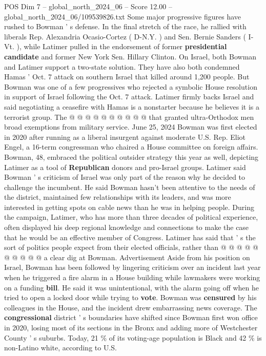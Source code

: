 \begin{textsample}{POS Dim 7 – global\_north\_2024\_06 – Score 12.00 – global\_north\_2024\_06/109539826.txt}
Some major progressive figures have rushed to Bowman ' s defense.
In the final stretch of the race, he rallied with liberals Rep.
Alexandria Ocasio-Cortez ( D-N.Y. ) and Sen.
Bernie Sanders ( I-Vt. ), while Latimer pulled in the endorsement of former \textbf{presidential} \textbf{candidate} and former New York Sen.
Hillary Clinton.
On Israel, both Bowman and Latimer support a two-state solution.
They have also both condemned Hamas ' Oct. 7 attack on southern Israel that killed around 1,200 people.
But Bowman was one of a few progressives who rejected a symbolic House resolution in support of Israel following the Oct. 7 attack.
Latimer firmly backs Israel and said negotiating a ceasefire with Hamas is a nonstarter because he believes it is a terrorist group.
The @ @ @ @ @ @ @ @ @ @ that granted ultra-Orthodox men broad exemptions from military service.
June 25, 2024 Bowman was first elected in 2020 after running as a liberal insurgent against moderate U.S.
Rep.
Eliot Engel, a 16-term congressman who chaired a House committee on foreign affairs.
Bowman, 48, embraced the political outsider strategy this year as well, depicting Latimer as a tool of \textbf{Republican} donors and pro-Israel groups.
Latimer said Bowman ' s criticism of Israel was only part of the reason why he decided to challenge the incumbent.
He said Bowman hasn't been attentive to the needs of the district, maintained few relationships with its leaders, and was more interested in getting spots on cable news than he was in helping people.
During the campaign, Latimer, who has more than three decades of political experience, often displayed his deep regional knowledge and connections to make the case that he would be an effective member of Congress.
Latimer has said that ' s the sort of politics people expect from their elected officials, rather than @ @ @ @ @ @ @ @ @ @ a clear dig at Bowman.
Advertisement Aside from his position on Israel, Bowman has been followed by lingering criticism over an incident last year when he triggered a fire alarm in a House building while lawmakers were working on a funding \textbf{bill}.
He said it was unintentional, with the alarm going off when he tried to open a locked door while trying to \textbf{vote}.
Bowman was \textbf{censured} by his colleagues in the House, and the incident drew embarrassing news coverage.
The \textbf{congressional} district ' s boundaries have shifted since Bowman first won office in 2020, losing most of its sections in the Bronx and adding more of Westchester County ' s suburbs.
Today, 21 \% of its voting-age population is Black and 42 \% is non-Latino white, according to U.S.

\end{textsample}
